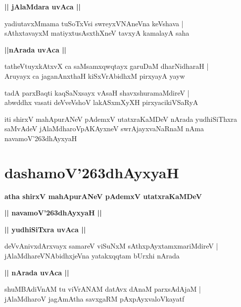\documentclass[twoside,12pt,openright]{book}
\def\S{\char'263}
\newcounter{shloka}[chapter]
\def\uvaca#1{\centerline{{\large\textbf{#1}}}}
\begin{document}
\uvaca{|| jAlaMdara uvAca ||}

\begin{shloka}%
yadiutavxMmama tuSoTxVsi swreyxVNAneVna keVshava |\\
sAthxtavayxM matiyxtusAsxthXneV tavxyA kamalayA saha 
\end{shloka}

\uvaca{||nArada uvAca ||}

\begin{shloka}%
tatheVtuyxkAtxvX ca saMsamxqwqtayx garuDaM dharNidharaH |\\
Aruyayx ca jaganAnxthaH kiSxVrAbidhxM pirxyayA yayw
\end{shloka}

\begin{shloka}%
tadA parxBaqti kaqSaNxsayx vAsaH shavxshuramaMdireV |\\
abwddhx vasati deVveVshoV lakASxmXyXH pirxyacikiVSaRyA 
\end{shloka}

\begin{center}
iti shirxV mahApurANeV pAdemxV utatxraKaMDeV  nArada yudhiSiThxra saMvAdeV jAlaMdharoVpAKAyxneV swrAjayxvaNaRnaM nAma 
navamoV\S dhAyxyaH 
\end{center}

\chapter{dashamoV\S dhAyxyaH}


\begin{center}
{\LARGE\bfseries atha shirxV mahApurANeV pAdemxV utatxraKaMDeV} 
\end{center}

\begin{center}
{\LARGE\bfseries  || navamoV\S dhAyxyaH ||}
\end{center}

\uvaca{|| yudhiSiTxra uvAca ||}

\begin{shloka}%
deVvAnivxdArxvayx samareV viSuNxM sAthxpAyxtamxmariMdireV |\\
jAlaMdhareVNAbidhxjeVna yatakxqqtam bUrxhi nArada 
\end{shloka}

\uvaca{|| nArada uvAca ||}

\begin{shloka}%
shuMBAdiVnAM tu viVrANAM datAvx dAnaM parxsAdAjaM  |\\
jAlaMdharoV jagAmAtha savxgaRM pAxpAyxvaloVkayatf
\end{shloka}
\end{document}
